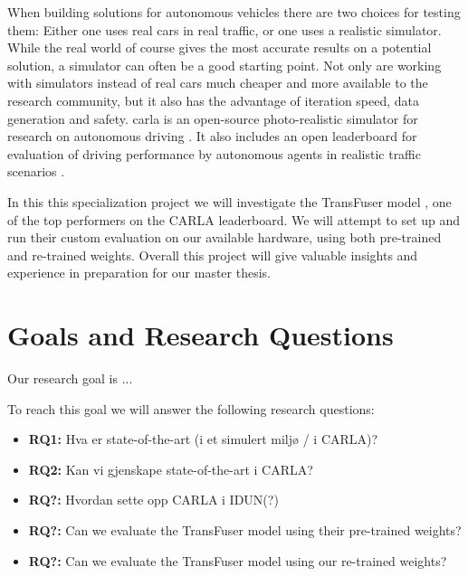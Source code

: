 

When building solutions for autonomous vehicles there are two choices for testing them: Either one uses real cars in real traffic, or one uses a realistic simulator. While the real world of course gives the most accurate results on a potential solution, a simulator can often be a good starting point. Not only are working with simulators instead of real cars much cheaper and more available to the research community, but it also has the advantage of iteration speed, data generation and safety. \acrfull{carla} is an open-source photo-realistic simulator for research on autonomous driving \cite{introducing-carla-paper}. It also includes an open leaderboard for evaluation of driving performance by autonomous agents in realistic traffic scenarios \cite{carla-leaderboard}.  

In this this specialization project we will investigate the TransFuser model \cite{transfuser-pami}, one of the top performers on the CARLA leaderboard. We will attempt to set up and run their custom evaluation on our available hardware, using both pre-trained and re-trained weights. Overall this project will give valuable insights and experience in preparation for our master thesis.


\begin{comment}
    
- How (connected) autonomous driving can mitigate traffic congestion, road safety, inefficient fuel consumption, etc. \cite{towards-connected-autonomous-driving}
- Mention why it is useful to experiment in a simulator? 
 --- Safety, easier to generate data, etc.

\end{comment}



\section{Goals and Research Questions}
Our research goal is ...

To reach this goal we will answer the following research questions:
\begin{itemize}
    \item \textbf{RQ1:} Hva er state-of-the-art (i et simulert miljø / i CARLA)?
    \item \textbf{RQ2:} Kan vi gjenskape state-of-the-art i CARLA?
    \item \textbf{RQ?:} Hvordan sette opp CARLA i IDUN(?)
    \item \textbf{RQ?:} Can we evaluate the TransFuser model using their pre-trained weights?
    \item \textbf{RQ?:} Can we evaluate the TransFuser model using our re-trained weights?
\end{itemize}


